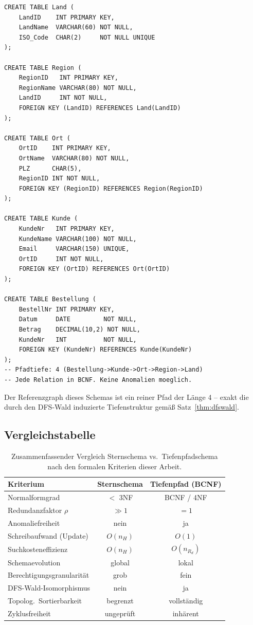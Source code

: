 ﻿\documentclass[a4paper,12pt]{report}
\theoremstyle{definition}
\theoremstyle{remark}
\begin{document}
\begin{lstlisting}[caption={Korrekte Tiefenpfadstruktur: BCNF-konformes Schema},label=lst:tief]
CREATE TABLE Land (
    LandID    INT PRIMARY KEY,
    LandName  VARCHAR(60) NOT NULL,
    ISO_Code  CHAR(2)     NOT NULL UNIQUE
);

CREATE TABLE Region (
    RegionID   INT PRIMARY KEY,
    RegionName VARCHAR(80) NOT NULL,
    LandID     INT NOT NULL,
    FOREIGN KEY (LandID) REFERENCES Land(LandID)
);

CREATE TABLE Ort (
    OrtID    INT PRIMARY KEY,
    OrtName  VARCHAR(80) NOT NULL,
    PLZ      CHAR(5),
    RegionID INT NOT NULL,
    FOREIGN KEY (RegionID) REFERENCES Region(RegionID)
);

CREATE TABLE Kunde (
    KundeNr   INT PRIMARY KEY,
    KundeName VARCHAR(100) NOT NULL,
    Email     VARCHAR(150) UNIQUE,
    OrtID     INT NOT NULL,
    FOREIGN KEY (OrtID) REFERENCES Ort(OrtID)
);

CREATE TABLE Bestellung (
    BestellNr INT PRIMARY KEY,
    Datum     DATE         NOT NULL,
    Betrag    DECIMAL(10,2) NOT NULL,
    KundeNr   INT          NOT NULL,
    FOREIGN KEY (KundeNr) REFERENCES Kunde(KundeNr)
);
-- Pfadtiefe: 4 (Bestellung->Kunde->Ort->Region->Land)
-- Jede Relation in BCNF. Keine Anomalien moeglich.
\end{lstlisting}

Der Referenzgraph dieses Schemas ist ein reiner Pfad der Länge 4 --
exakt die durch den DFS-Wald induzierte Tiefenstruktur gemäß
Satz~\ref{thm:dfswald}.

\subsection{Vergleichstabelle}

\begin{table}[H]
\centering
\renewcommand{\arraystretch}{1.35}
\begin{tabular}{lcc}
\toprule
\textbf{Kriterium} & \textbf{Sternschema} & \textbf{Tiefenpfad (BCNF)} \\
\midrule
Normalformgrad            & $<$ 3NF   & BCNF / 4NF \\
Redundanzfaktor $\rho$    & $\gg 1$   & $= 1$ \\
Anomaliefreiheit          & nein      & ja \\
Schreibaufwand (Update)   & $O(n_H)$  & $O(1)$ \\
Suchkosteneffizienz       & $O(n_H)$  & $O(n_{R_d})$ \\
Schemaevolution           & global    & lokal \\
Berechtigungsgranularität & grob      & fein \\
DFS-Wald-Isomorphismus    & nein      & ja \\
Topolog.\ Sortierbarkeit  & begrenzt  & vollständig \\
Zyklusfreiheit            & ungeprüft & inhärent \\
\bottomrule
\end{tabular}
\caption{Zusammenfassender Vergleich Sternschema vs.\ Tiefenpfadschema
nach den formalen Kriterien dieser Arbeit.}
\label{tab:vergleich}
\end{table}
\end{document}
